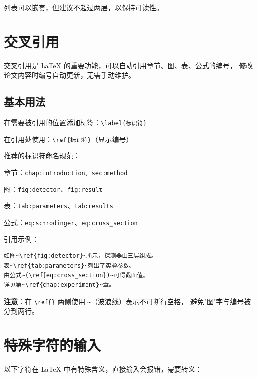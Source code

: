 列表可以嵌套，但建议不超过两层，以保持可读性。

\section{交叉引用}\label{sec:crossref}

交叉引用是 \LaTeX{} 的重要功能，可以自动引用章节、图、表、公式的编号，
修改论文内容时编号自动更新，无需手动维护。

\subsection{基本用法}

\begin{compactenum}
    \item 在需要被引用的位置添加标签：\verb|\label{标识符}|
    \item 在引用处使用：\verb|\ref{标识符}|（显示编号）
\end{compactenum}

推荐的标识符命名规范：

\begin{compactitem}
    \item 章节：\verb|chap:introduction|、\verb|sec:method|
    \item 图：\verb|fig:detector|、\verb|fig:result|
    \item 表：\verb|tab:parameters|、\verb|tab:results|
    \item 公式：\verb|eq:schrodinger|、\verb|eq:cross_section|
\end{compactitem}

引用示例：

\begin{verbatim}
如图~\ref{fig:detector}~所示，探测器由三层组成。
表~\ref{tab:parameters}~列出了实验参数。
由公式~(\ref{eq:cross_section})~可得截面值。
详见第~\ref{chap:experiment}~章。
\end{verbatim}

\textbf{注意}：在 \verb|\ref{}| 两侧使用 \verb|~|（波浪线）表示不可断行空格，
避免"图"字与编号被分到两行。

\section{特殊字符的输入}

以下字符在 \LaTeX{} 中有特殊含义，直接输入会报错，需要转义：

